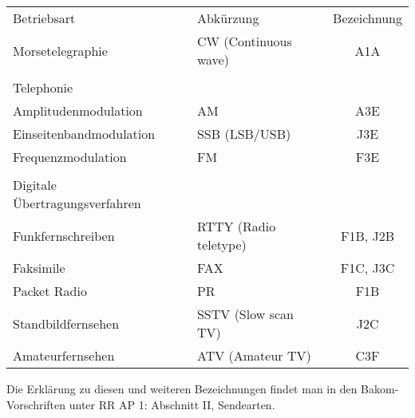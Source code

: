 \begin{tabular}{llc}
Betriebsart & Abkürzung & Bezeichnung \\
Morsetelegraphie & CW (Continuous wave) & A1A \\
 &  &  \\
Telephonie &  &  \\
Amplitudenmodulation & AM & A3E \\
Einseitenbandmodulation & SSB (LSB/USB) & J3E \\
Frequenzmodulation & FM & F3E \\
 &  &  \\
Digitale Übertragungsverfahren &  &  \\
Funkfernschreiben & RTTY (Radio teletype) & F1B, J2B \\
Faksimile & FAX & F1C, J3C \\
Packet Radio & PR & F1B \\
Standbildfernsehen & SSTV (Slow scan TV) & J2C \\
Amateurfernsehen & ATV (Amateur TV) & C3F
\end{tabular}

Die Erklärung zu diesen und weiteren Bezeichnungen findet man in den Bakom-Vorschriften unter RR AP 1: Abschnitt II, Sendearten.